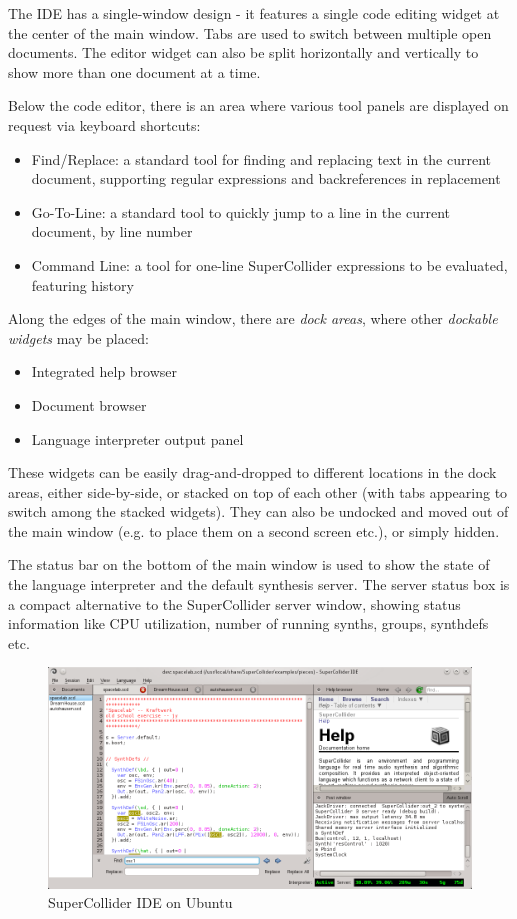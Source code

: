 \documentclass[11pt,a4paper]{article}
\begin{document}
The IDE has a single-window design - it features a single code editing widget at the center of the main window. Tabs are
used to switch between multiple open documents. The editor widget can also be split horizontally and vertically to show
more than one document at a time.

Below the code editor, there is an area where various tool panels are displayed on request via keyboard shortcuts:
\begin{itemize}
  \item Find/Replace: a standard tool for finding and replacing text in the current document, supporting regular
expressions and backreferences in replacement
  \item Go-To-Line: a standard tool to quickly jump to a line in the current document, by line number
  \item Command Line: a tool for one-line SuperCollider expressions to be evaluated, featuring history
\end{itemize}

Along the edges of the main window, there are \emph{dock areas}, where other \emph{dockable widgets} may be placed:
\begin{itemize}
  \item Integrated help browser
  \item Document browser
  \item Language interpreter output panel
\end{itemize}

These widgets can be easily drag-and-dropped to different locations in the dock areas, either side-by-side, or stacked
on top of each other (with tabs appearing to switch among the stacked widgets). They can also be undocked and moved out
of the main window (e.g. to place them on a second screen etc.), or simply hidden.

The status bar on the bottom of the main window is used to show the state of the language interpreter and the default
synthesis server. The server status box is a compact alternative to the SuperCollider server window, showing status
information like CPU utilization, number of running synths, groups, synthdefs etc.

\begin{figure}[]
  \centering
  \includegraphics[width=\textwidth]{overview}
  \caption{SuperCollider IDE on Ubuntu}
  \label{fig:mainwin}
\end{figure}
\end{document}
